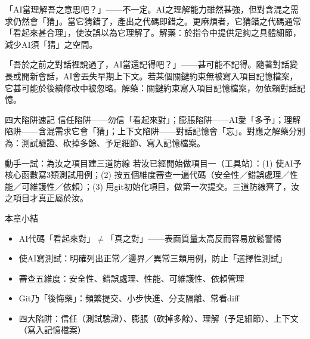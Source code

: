 
「AI當理解吾之意思吧？」——不一定。AI之理解能力雖然甚強，但對含混之需求仍然會「猜」。當它猜錯了，產出之代碼即錯之。更麻煩者，它猜錯之代碼通常「看起來甚合理」，使汝誤以為它理解了。解藥：於指令中提供足夠之具體細節，減少AI須「猜」之空間。


「吾於之前之對話裡說過了，AI當還記得吧？」——甚可能不記得。隨著對話變長或開新會話，AI會丟失早期上下文。若某個關鍵約束無被寫入項目記憶檔案，它甚可能於後續修改中被忽略。解藥：關鍵約束寫入項目記憶檔案，勿依賴對話記憶。

\begin{tcbwarn}{四大陷阱速記}
信任陷阱——勿信「看起來對」；膨脹陷阱——AI愛「多予」；理解陷阱——含混需求它會「猜」；上下文陷阱——對話記憶會「忘」。對應之解藥分別為：測試驗證、砍掉多餘、予足細節、寫入記憶檔案。

\end{tcbwarn}

\begin{tcbpractice}{動手一試：為汝之項目建三道防線}
若汝已經開始做項目一（工具站）：(1) 使AI予核心函數寫3類測試用例；(2) 按五個維度審查一遍代碼（安全性／錯誤處理／性能／可維護性／依賴）；(3) 用git初始化項目，做第一次提交。三道防線齊了，汝之項目才真正屬於汝。

\end{tcbpractice}

\begin{tcbsummary}{本章小結}
\begin{itemize}
  \item AI代碼「看起來對」$\neq$「真之對」——表面質量太高反而容易放鬆警惕
  \item 使AI寫測試：明確列出正常／邊界／異常三類用例，防止「選擇性測試」
  \item 審查五維度：安全性、錯誤處理、性能、可維護性、依賴管理
  \item Git乃「後悔藥」：頻繁提交、小步快進、分支隔離、常看diff
  \item 四大陷阱：信任（測試驗證）、膨脹（砍掉多餘）、理解（予足細節）、上下文（寫入記憶檔案）
\end{itemize}

\end{tcbsummary}
